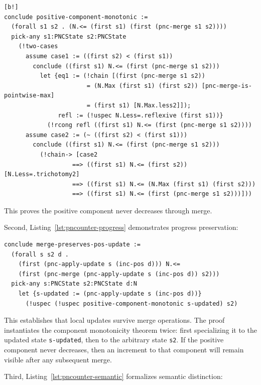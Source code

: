 \begin{lstlisting}[language=Athena,style=athena,label={lst:pncounter-monotonic},caption={PN-Counter: Component monotonicity}][b!]
conclude positive-component-monotonic :=
  (forall s1 s2 . (N.<= (first s1) (first (pnc-merge s1 s2))))
  pick-any s1:PNCState s2:PNCState
    (!two-cases
      assume case1 := ((first s2) < (first s1))
        conclude ((first s1) N.<= (first (pnc-merge s1 s2)))
          let {eq1 := (!chain [(first (pnc-merge s1 s2))
                       = (N.Max (first s1) (first s2)) [pnc-merge-is-pointwise-max]
                       = (first s1) [N.Max.less2]]);
               refl := (!uspec N.Less=.reflexive (first s1))}
            (!rcong refl ((first s1) N.<= (first (pnc-merge s1 s2))))
      assume case2 := (~ ((first s2) < (first s1)))
        conclude ((first s1) N.<= (first (pnc-merge s1 s2)))
          (!chain-> [case2
                   ==> ((first s1) N.<= (first s2)) [N.Less=.trichotomy2]
                   ==> ((first s1) N.<= (N.Max (first s1) (first s2)))
                   ==> ((first s1) N.<= (first (pnc-merge s1 s2)))]))
\end{lstlisting}

This proves the positive component never decreases through merge.

Second, Listing~\ref{lst:pncounter-progress} demonstrates progress preservation:

\begin{lstlisting}[language=Athena,style=athena,label={lst:pncounter-progress},caption={PN-Counter: Progress preservation (updates survive merging)}]
conclude merge-preserves-pos-update :=
  (forall s s2 d .
    (first (pnc-apply-update s (inc-pos d))) N.<= 
    (first (pnc-merge (pnc-apply-update s (inc-pos d)) s2)))
  pick-any s:PNCState s2:PNCState d:N
    let {s-updated := (pnc-apply-update s (inc-pos d))}
      (!uspec (!uspec positive-component-monotonic s-updated) s2)
\end{lstlisting}

This establishes that local updates survive merge operations. The proof instantiates the component monotonicity theorem twice: first specializing it to the updated state \texttt{s-updated}, then to the arbitrary state \texttt{s2}. If the positive component never decreases, then an increment to that component will remain visible after any subsequent merge.

Third, Listing~\ref{lst:pncounter-semantic} formalizes semantic distinction:

